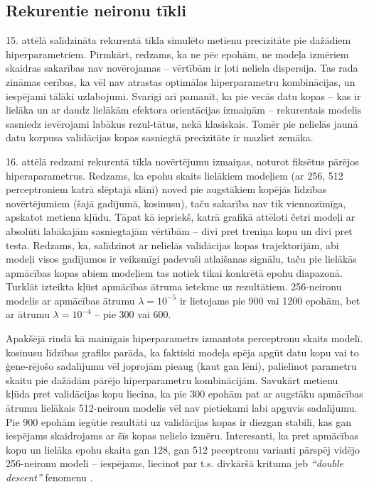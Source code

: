 \documentclass[12pt, a4paper]{article}
\numberwithin{equation}{section} %
\begin{document}
\subsection{Rekurentie neironu tīkli}

15. attēlā salīdzināta rekurentā tīkla simulēto metienu precizitāte pie dažādiem hiperparametriem. Pirmkārt, redzams, ka ne pēc epohām, ne modeļa izmēriem skaidras sakarības nav novērojamas -- vērtībām ir ļoti neliela dispersija. Tas rada zināmas cerības, ka vēl nav atrastas optimālas hiperparametru kombinācijas, un iespējami tālāki uzlabojumi. Svarīgi arī pamanīt, ka pie vecās datu kopas -- kas ir lielāka un ar daudz lielākām efektora orientācijas izmaiņām -- rekurentais modelis sasniedz ievērojami labākus rezul-tātus, nekā klasiskais. Tomēr pie nelielās jaunā datu korpusa validācijas kopas sasniegtā precizitāte ir mazliet zemāka.


16. attēlā redzami rekurentā tīkla novērtējumu izmaiņas, noturot fiksētus pārējos hiperaparametrus. Redzams, ka epohu skaits lielākiem modeļiem (ar 256, 512 perceptroniem katrā slēptajā slānī) noved pie augstākiem kopējās līdzības novērtējumiem (šajā gadījumā, kosinusu), taču sakarība nav tik viennozīmīga, apskatot metiena kļūdu. Tāpat kā iepriekš, katrā grafikā attēloti četri modeļi ar absolūti labākajām sasniegtajām vērtībām -- divi pret treniņa kopu un divi pret testa. Redzams, ka, salīdzinot ar nelielās validācijas kopas trajektorijām, abi modeļi visos gadījumos ir veiksmīgi padevuši atlaišanas signālu, taču pie lielākās apmācības kopas abiem modeļiem tas notiek tikai konkrētā epohu diapazonā. Turklāt izteikta kļūst apmācības ātruma ietekme uz rezultātiem. 256-neironu modelis ar apmācības ātrumu $\lambda = 10^{-5}$ ir lietojams pie 900 vai 1200 epohām, bet ar ātrumu $\lambda = 10^{-4}$ -- pie 300 vai 600. 

Apakšējā rindā kā mainīgais hiperparametrs izmantots perceptronu skaits modelī. kosinusu līdzības grafiks parāda, ka faktiski modeļa spēja apgūt datu kopu vai to ģene-rējošo sadalījumu vēl joprojām pieaug (kaut gan lēni), palielinot parametru skaitu pie dažādām pārējo hiperparametru kombinācijām. Savukārt metienu kļūda pret validācijas kopu liecina, ka pie 300 epohām pat ar augstāku apmācības ātrumu lielākais 512-neironu modelis vēl nav pietiekami labi apguvis sadalījumu. Pie 900 epohām iegūtie rezultāti uz validācijas kopas ir diezgan stabili, kas gan iespējams skaidrojams ar šīs kopas nelielo izmēru. Interesanti, ka pret apmācības kopu un lielāka epohu skaita gan 128, gan 512 peceptronu varianti pārspēj vidējo 256-neironu modeli -- iespējams, liecinot par t.s. divkāršā krituma jeb \textit{``double descent''} fenomenu \cite{nakkiran2021deep}.
\end{document}
